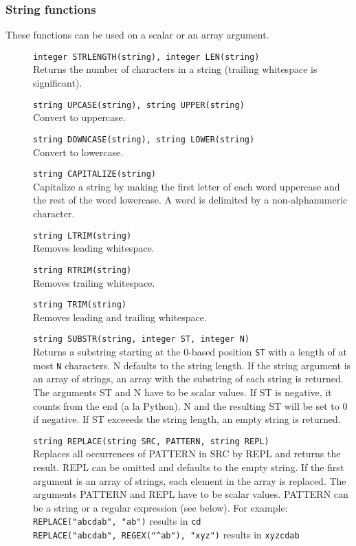 \subsubsection{String functions}
These functions can be used on a scalar or an array argument.
\begin{description}
  \item[] \texttt{integer STRLENGTH(string),  integer LEN(string)}\\
    Returns the number of characters in a string
    (trailing whitespace is significant).
  \item[] \texttt{string UPCASE(string), string UPPER(string) }\\
    Convert to uppercase.
  \item[] \texttt{string DOWNCASE(string),  string LOWER(string)}\\
    Convert to lowercase.
  \item[] \texttt{string CAPITALIZE(string)}\\
    Capitalize a string  by making the first letter of each word
    uppercase and the rest of the word lowercase. A word is delimited
    by a non-alphanumeric  character.
  \item[] \texttt{string LTRIM(string)}\\
    Removes leading whitespace.
  \item[] \texttt{string RTRIM(string)}\\
    Removes trailing whitespace.
  \item[] \texttt{string TRIM(string)}\\
    Removes leading and trailing whitespace.
  \item[] \texttt{string SUBSTR(string, integer ST, integer N)}\\
    Returns a substring starting at the 0-based position
    \texttt{ST} with a length of at most \texttt{N} characters. N
    defaults to the string length.
   If the string argument is an array of strings, an array with the substring of each
   string is returned. The arguments ST and N have to be scalar
   values. If ST is negative, it counts from the end (a la Python).
   N and the resulting ST will be set to 0 if negative. If ST exceeeds
   the string length, an empty string is returned.
  \item[] \texttt{string REPLACE(string SRC, PATTERN, string REPL)}\\
   Replaces all occurrences of PATTERN in SRC by REPL and returns the
   result. REPL can be omitted and defaults to the empty string.
   If the first argument is an array of strings, each element in the
   array is replaced.
   The arguments PATTERN and REPL have to be scalar values. PATTERN
   can be a string or a regular expression (see below). For example:
   \\\verb+REPLACE("abcdab", "ab")+ results in \texttt{cd}
   \\\verb+REPLACE("abcdab", REGEX("^ab"), "xyz")+ results in \texttt{xyzcdab}
\end{description}

